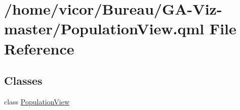 \hypertarget{_population_view_8qml}{}\section{/home/vicor/\+Bureau/\+G\+A-\/\+Viz-\/master/\+Population\+View.qml File Reference}
\label{_population_view_8qml}
\subsection*{Classes}
\begin{DoxyCompactItemize}
\item 
class \hyperlink{class_population_view}{Population\+View}
\end{DoxyCompactItemize}
